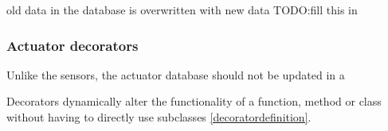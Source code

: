 old data in the database is overwritten with new data TODO:fill this in

\subsubsection{Actuator decorators}
Unlike the sensors, the actuator database should not be updated in a

\label{decoratordefinition}
Decorators dynamically alter the functionality of a function, method or class without having to directly use subclasses \ref{decoratordefinition}.
